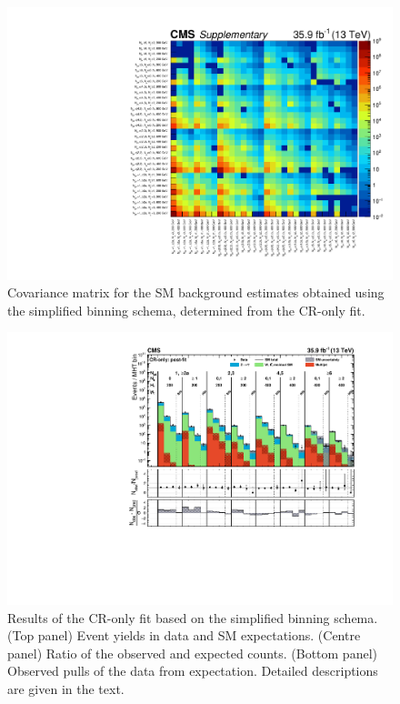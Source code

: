 \clearpage
\begin{figure}
  \centering
  \includegraphics[width=\textwidth]{Supplementary/covariance_aux}
  \caption{Covariance matrix for the SM background estimates obtained
    using the simplified binning schema, determined from the CR-only
    fit.  }
  \label{fig:covariance_aux}
\end{figure} 

\clearpage
\begin{figure}[h!]
  \centering
  \includegraphics[width=0.95\linewidth]{Supplementary/SimplifiedBinning_results_cr-only-fit_aux} 
  \caption{Results of the CR-only fit based on the simplified binning
    schema. (Top panel) Event yields in data and SM
    expectations. (Centre panel) Ratio of the observed and expected
    counts. (Bottom panel) Observed pulls of the data from
    expectation. Detailed descriptions are given in the text.
  }
  \label{fig:aggregated_results}
\end{figure}

